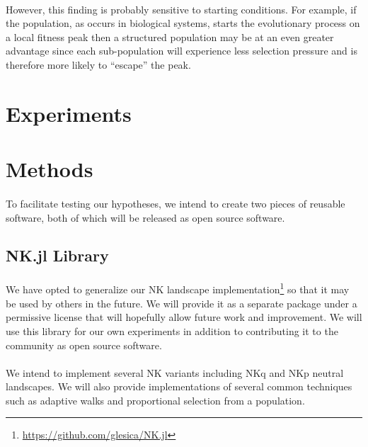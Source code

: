 \documentclass[12pt,letterpaper,titlepage]{article}
\begin{document}
\paragraph{}
However, this finding is probably sensitive to starting conditions. For
example, if the population, as occurs in biological systems, starts the
evolutionary process on a local fitness peak then a structured population may
be at an even greater advantage since each sub-population will experience less
selection pressure and is therefore more likely to ``escape'' the peak.

\section{Experiments}

\section{Methods}

\paragraph{}
To facilitate testing our hypotheses, we intend to create two pieces of
reusable software, both of which will be released as open source software.

\subsection{NK.jl Library}

\paragraph{}
We have opted to generalize our NK landscape
implementation\footnote{\url{https://github.com/glesica/NK.jl}} so that it may
be used by others in the future. We will provide it as a separate package under
a permissive license that will hopefully allow future work and improvement.  We
will use this library for our own experiments in addition to contributing it to
the community as open source software.

\paragraph{}
We intend to implement several NK variants including NKq and NKp neutral
landscapes. We will also provide implementations of several common techniques
such as adaptive walks and proportional selection from a population.
\end{document}
